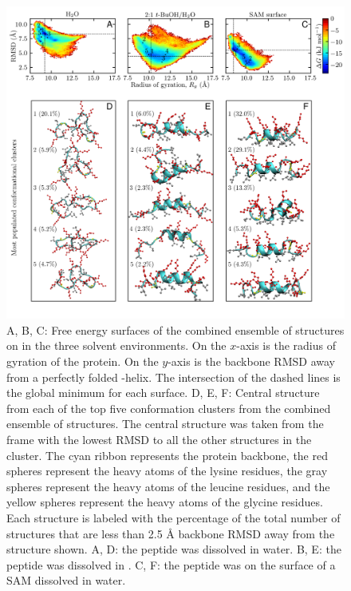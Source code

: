 \begin{figure}
    \center
    \includegraphics[width=5.50in]{figures-helix/clusters_proofs.png}
    \caption[Free energy surfaces and most populated clusters of \pep{} in each solvent environments]{
        A, B, C: Free energy surfaces of the combined ensemble of structures on \pep{} in the three solvent environments. 
        On the $x$-axis is the radius of gyration of the protein. 
        On the $y$-axis is the backbone RMSD away from a perfectly folded \textalpha{}-helix. 
        The intersection of the dashed lines is the global minimum for each surface. 
        D, E, F: Central structure from each of the top five conformation clusters from the combined ensemble of structures. 
        The central structure was taken from the frame with the lowest RMSD to all the other structures in the cluster. 
        The cyan ribbon represents the protein backbone, the red spheres represent the heavy atoms of the lysine residues, the gray spheres represent the heavy atoms of the leucine residues, and the yellow spheres represent the heavy atoms of the glycine residues. 
        Each structure is labeled with the percentage of the total number of structures that are less than 2.5 \si{\angstrom} backbone RMSD away from the structure shown. 
        A, D: the peptide was dissolved in water. 
        B, E: the peptide was dissolved in \tbawat{}. 
        C, F: the peptide was on the surface of a SAM dissolved in water.
    }
    \label{fig:helix-free_cluster}
\end{figure}


